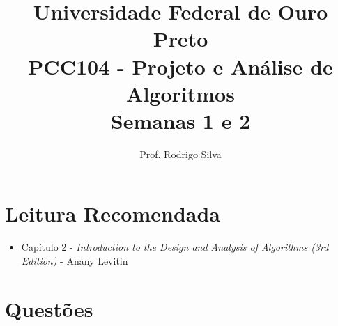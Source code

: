 \documentclass{article}
\title{\vspace{-2 cm}Universidade Federal de Ouro Preto \\ PCC104 - Projeto e Análise de Algoritmos \\ Semanas 1 e 2}
\author{Prof. Rodrigo Silva}
\begin{document}
\maketitle


\section{Leitura Recomendada}

\begin{itemize}
    \item Capítulo 2 - \textit{Introduction to the Design and Analysis of Algorithms (3rd Edition)} - Anany Levitin 
\end{itemize}

\section{Questões}
\end{document}
